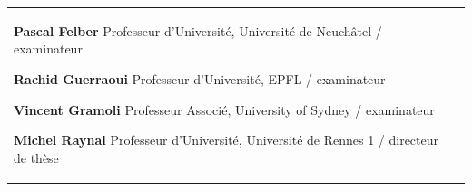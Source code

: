 \begin{titlepage}
\begin{center}
\begin{minipage}{\glarg}
\begin{tabular}{p{7cm}p{10cm}}
\begin{minipage}{\plarg}
{\Large\bf Pascal Felber \vspace{0mm}\newline}
{ Professeur d'Universit{\'e},  Universit{\'e} de Neuch\^{a}tel \!/\! examinateur\vspace{-2mm}\newline}

{\Large\bf Rachid Guerraoui\vspace{0mm}\newline}
{ Professeur d'Universit{\'e}, EPFL \!/\! examinateur \vspace{-2mm}\newline}

{\Large\bf Vincent Gramoli \vspace{0mm}\newline}
{ Professeur Associ{\'e}, University of Sydney \!/\! examinateur\vspace{-2mm}\newline}

{\Large\bf Michel Raynal \vspace{0mm}\newline}
{ Professeur d'Universit{\'e}, Universit{\'e} de Rennes 1 \!/\! directeur de th\`ese\vspace{-2mm}\newline}



\end{minipage}
\end{tabular}

\end{minipage}
\end{center}
\end{titlepage}

